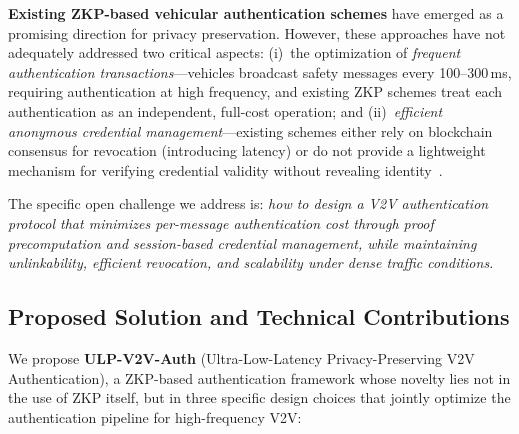 \textbf{Existing ZKP-based vehicular authentication schemes} have emerged as a
promising direction for privacy preservation. However, these approaches have not
adequately addressed two critical aspects: (i)~the optimization of \emph{frequent
authentication transactions}---vehicles broadcast safety messages every 100--300\,ms,
requiring authentication at high frequency, and existing ZKP schemes treat each
authentication as an independent, full-cost operation; and (ii)~\emph{efficient
anonymous credential management}---existing schemes either rely on blockchain
consensus for revocation (introducing latency) or do not provide a lightweight
mechanism for verifying credential validity without revealing
identity~\cite{jiang2024,pathak2024,zheng2024hybrid}.

The specific open challenge we address is: \emph{how to design a V2V authentication
protocol that minimizes per-message authentication cost through proof precomputation
and session-based credential management, while maintaining unlinkability, efficient
revocation, and scalability under dense traffic conditions.}

\subsection{Proposed Solution and Technical Contributions}

We propose \textbf{ULP-V2V-Auth} (Ultra-Low-Latency Privacy-Preserving V2V
Authentication), a ZKP-based authentication framework whose novelty lies not in the
use of ZKP itself, but in three specific design choices that jointly optimize the
authentication pipeline for high-frequency V2V:

